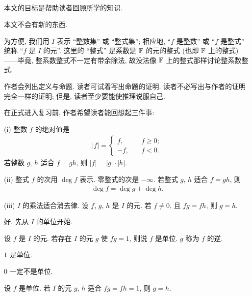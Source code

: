 \subsection*{}

本文的目标是帮助读者回顾所学的知识.

本文不会有新的东西.

为方便, 我们用 $I$ 表示 ``整数集'' 或 ``整式集''; 相应地, ``$f$ 是整数'' 或 ``$f$ 是整式'' 统称 ``$f$ 是 $I$ 的元''. 这里的 ``整式'' 是系数是 $\mathbb{F}$ 的元的整式 (也即 $\mathbb{F}$ 上的整式)——毕竟, 整系数整式不一定有带余除法, 故没法像 $\mathbb{F}$ 上的整式那样讨论整系数整式.

作者会列出定义与命题. 读者可试着写出命题的证明. 读者不必写出与作者的证明完全一样的证明; 但是, 读者至少要能使推理说服自己.

在正式进入复习前, 作者希望读者能回想起三件事:

(i) 整数 $f$ 的绝对值是
\begin{align*}
    |f| = \begin{cases}
        f,  & \quad f \geq 0; \\
        -f, & \quad f < 0.
    \end{cases}
\end{align*}
若整数 $g$, $h$ 适合 $f = gh$, 则 $|f| = |g| \cdot |h|$.

(ii) 整式 $f$ 的次用 $\deg f$ 表示. 零整式的次是 $-\infty$. 若整式 $g$, $h$ 适合 $f = gh$, 则
\begin{align*}
    \deg f = \deg g + \deg h.
\end{align*}

(iii) $I$ 的乘法适合消去律. 设 $f$, $g$, $h$ 是 $I$ 的元. 若 $f \neq 0$, 且 $fg = fh$, 则 $g = h$.

好. 先从 $I$ 的单位开始.

\begin{definition}
    设 $f$ 是 $I$ 的元. 若存在 $I$ 的元 $g$ 使 $fg = 1$, 则说 $f$ 是单位. $g$ 称为 $f$ 的逆.
\end{definition}

\begin{proposition}
    $1$ 是单位.
\end{proposition}

\begin{proposition}
    $0$ 一定不是单位.
\end{proposition}

\begin{proposition}
    设 $f$ 是单位. 若 $I$ 的元 $g$, $h$ 适合 $fg = fh = 1$, 则 $g = h$.
\end{proposition}

